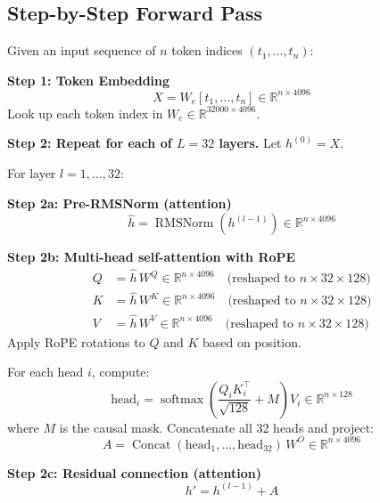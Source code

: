 \documentclass[11pt,a4paper]{article}
\newcommand{\R}{\mathbb{R}}
\newcommand{\softmax}{\operatorname{softmax}}
\newcommand{\RMSNorm}{\operatorname{RMSNorm}}
\newcommand{\Concat}{\operatorname{Concat}}
\begin{document}
\subsection{Step-by-Step Forward Pass}

Given an input sequence of $n$ token indices $(t_1, \ldots, t_n)$:

\medskip

\noindent\textbf{Step 1: Token Embedding}
\begin{equation}
  X = W_e[t_1, \ldots, t_n] \in \R^{n \times 4096}
\end{equation}
Look up each token index in $W_e \in \R^{32000 \times 4096}$.

\medskip

\noindent\textbf{Step 2: Repeat for each of $L = 32$ layers.} Let $h^{(0)} = X$.

For layer $l = 1, \ldots, 32$:

\medskip

\noindent\textbf{Step 2a: Pre-RMSNorm (attention)}
\begin{equation}
  \hat{h} = \RMSNorm(h^{(l-1)}) \in \R^{n \times 4096}
\end{equation}

\noindent\textbf{Step 2b: Multi-head self-attention with RoPE}
\begin{align}
  Q &= \hat{h} \, W^Q \in \R^{n \times 4096} \quad \text{(reshaped to $n \times 32 \times 128$)} \\
  K &= \hat{h} \, W^K \in \R^{n \times 4096} \quad \text{(reshaped to $n \times 32 \times 128$)} \\
  V &= \hat{h} \, W^V \in \R^{n \times 4096} \quad \text{(reshaped to $n \times 32 \times 128$)}
\end{align}
Apply RoPE rotations to $Q$ and $K$ based on position.

For each head $i$, compute:
\begin{equation}
  \text{head}_i = \softmax\!\left(\frac{Q_i K_i^\top}{\sqrt{128}} + M\right) V_i
  \in \R^{n \times 128}
\end{equation}
where $M$ is the causal mask. Concatenate all 32 heads and project:
\begin{equation}
  A = \Concat(\text{head}_1, \ldots, \text{head}_{32}) \, W^O \in \R^{n \times 4096}
\end{equation}

\noindent\textbf{Step 2c: Residual connection (attention)}
\begin{equation}
  h' = h^{(l-1)} + A
\end{equation}
\end{document}
